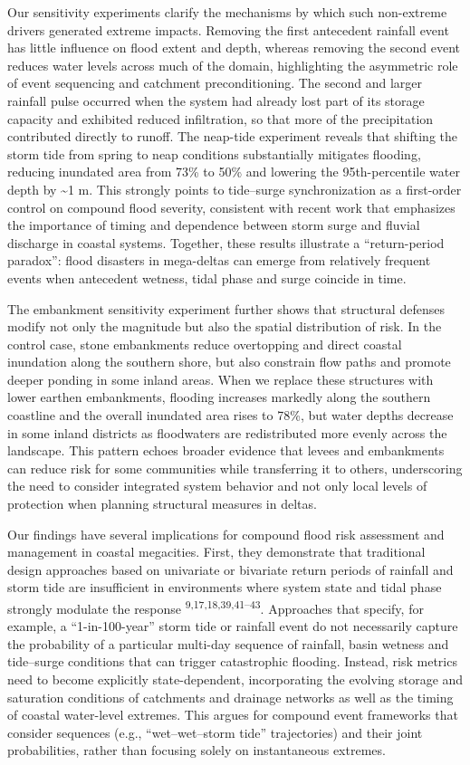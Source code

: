 \documentclass[
]{article}
\begin{document}
Our sensitivity experiments clarify the mechanisms by which such
non-extreme drivers generated extreme impacts. Removing the first
antecedent rainfall event has little influence on flood extent and
depth, whereas removing the second event reduces water levels across
much of the domain, highlighting the asymmetric role of event sequencing
and catchment preconditioning. The second and larger rainfall pulse
occurred when the system had already lost part of its storage capacity
and exhibited reduced infiltration, so that more of the precipitation
contributed directly to runoff. The neap-tide experiment reveals that
shifting the storm tide from spring to neap conditions substantially
mitigates flooding, reducing inundated area from 73\% to 50\% and
lowering the 95th-percentile water depth by \textasciitilde1 m. This
strongly points to tide--surge synchronization as a first-order control
on compound flood severity, consistent with recent work that emphasizes
the importance of timing and dependence between storm surge and fluvial
discharge in coastal systems. Together, these results illustrate a
``return-period paradox'': flood disasters in mega-deltas can emerge
from relatively frequent events when antecedent wetness, tidal phase and
surge coincide in time.

The embankment sensitivity experiment further shows that structural
defenses modify not only the magnitude but also the spatial distribution
of risk. In the control case, stone embankments reduce overtopping and
direct coastal inundation along the southern shore, but also constrain
flow paths and promote deeper ponding in some inland areas. When we
replace these structures with lower earthen embankments, flooding
increases markedly along the southern coastline and the overall
inundated area rises to 78\%, but water depths decrease in some inland
districts as floodwaters are redistributed more evenly across the
landscape. This pattern echoes broader evidence that levees and
embankments can reduce risk for some communities while transferring it
to others, underscoring the need to consider integrated system behavior
and not only local levels of protection when planning structural
measures in deltas.

Our findings have several implications for compound flood risk
assessment and management in coastal megacities. First, they demonstrate
that traditional design approaches based on univariate or bivariate
return periods of rainfall and storm tide are insufficient in
environments where system state and tidal phase strongly modulate the
response \textsuperscript{9,17,18,39,41--43}. Approaches that specify,
for example, a ``1-in-100-year'' storm tide or rainfall event do not
necessarily capture the probability of a particular multi-day sequence
of rainfall, basin wetness and tide--surge conditions that can trigger
catastrophic flooding. Instead, risk metrics need to become explicitly
state-dependent, incorporating the evolving storage and saturation
conditions of catchments and drainage networks as well as the timing of
coastal water-level extremes. This argues for compound event frameworks
that consider sequences (e.g., ``wet--wet--storm tide'' trajectories)
and their joint probabilities, rather than focusing solely on
instantaneous extremes.
\end{document}
